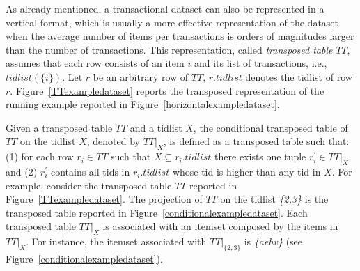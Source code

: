 As already mentioned, a transactional dataset can also be represented in a vertical format, which is
usually a more effective representation of the dataset when the average number
of items per transactions is orders of magnitudes larger than the number of
transactions.
This representation, called \textit{transposed table} $TT$, assumes that each
row consists of an item $i$ and its list of transactions, i.e.,
$tidlist(\{i\})$. Let $r$ be an arbitrary row of $TT$, $r.tidlist$ denotes the
tidlist of row $r$.
Figure~\ref{TTexampledataset} reports the transposed representation of the
running example reported in Figure~\ref{horizontalexampledataset}.

Given a transposed table $TT$ and a tidlist $X$, the conditional transposed
table of $TT$ on the tidlist $X$, denoted
by $TT|_{X}$, is defined as a transposed table such that:
(1) for each row $r_i\in TT$ such that $X\subseteq r_i.tidlist$ there exists one
tuple $r_i^{\prime}\in TT|_{X}$ and
(2) $r_i^{\prime}$ contains all tids in $r_i.tidlist$ whose tid is higher than
any tid in $X$.
For example, consider the transposed table $TT$ reported in
Figure~\ref{TTexampledataset}. The
projection of $TT$ on the tidlist \textit{\{2,3\}} is the transposed table
reported in Figure~\ref{conditionalexampledataset}.
Each transposed table $TT|_{X}$ is associated with an itemset composed by the
items in $TT|_{X}$.
For instance, the itemset associated with $TT|_{\{2,3\}}$ is \textit{\{aehv\}}
(see Figure~\ref{conditionalexampledataset}).



